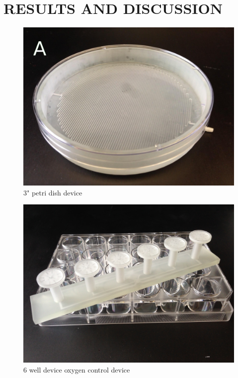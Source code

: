 \documentclass{article}
\begin{document}
\section{RESULTS AND DISCUSSION}



\begin{figure}[h!]
\centering
\includegraphics[scale=0.2]{3-inch-well-photo.png}
\caption{3" petri dish device}
\label{fig:3-inch-well-photo}
\end{figure}

\begin{figure}[h!]
\centering
\includegraphics[scale=0.2]{6-well.JPG}
\caption{6 well device oxygen control device}
\label{fig:6-well-photo}
\end{figure}
\end{document}
